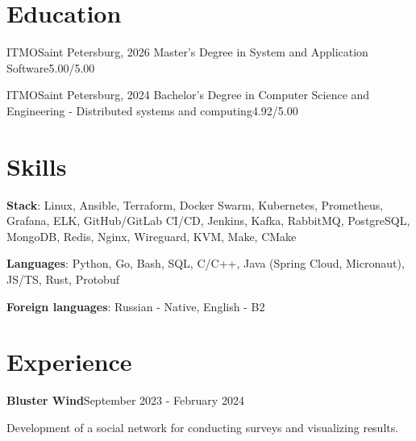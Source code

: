 \documentclass[letterpaper,11pt]{article}
\begin{document}
\section{Education}
\resumeSubHeadingListStart
  \resumeSubheading
    {ITMO}{Saint Petersburg, 2026}
    {Master’s Degree in System and Application Software}{5.00/5.00}

  \resumeSubheading
    {ITMO}{Saint Petersburg, 2024}
    {Bachelor’s Degree in Computer Science and Engineering - Distributed systems and computing}{4.92/5.00}
\resumeSubHeadingListEnd

\section{Skills}
\resumeSubHeadingListStart
  \small{\item{
    \textbf{Stack}{: Linux, Ansible, Terraform, Docker Swarm, Kubernetes, Prometheus, Grafana, ELK, GitHub/GitLab CI/CD, Jenkins, Kafka, RabbitMQ, PostgreSQL, MongoDB, Redis, Nginx, Wireguard, KVM, Make, CMake }

   \textbf{Languages}{: Python, Go, Bash, SQL, C/C++, Java (Spring Cloud, Micronaut), JS/TS, Rust, Protobuf }

   \textbf{Foreign languages}{: Russian - Native, English - B2}%
  }}
\resumeSubHeadingListEnd

\section{Experience}
\resumeSubHeadingListStart
  \resumeExperienceHeading
    {\textbf{Bluster Wind}}{September 2023 - February 2024}

    {\vspace{-10pt}\small Development of a social network for conducting surveys and visualizing results.\vspace{-7pt}}

  \resumeItemListStart
  \resumeItemListEnd
\resumeSubHeadingListEnd
\end{document}
